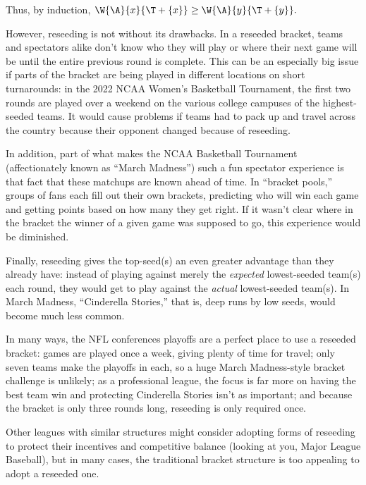 {{    Thus, by induction, $\W{\A}{x}{\T + \{x\}} \geq \W{\A}{y}{\T + \{y\}}.$
}{}




However, reseeding is not without its drawbacks. In a reseeded bracket, teams and spectators alike don't know who they will play or where their next game will be until the entire previous round is complete. This can be an especially big issue if parts of the bracket are being played in different locations on short turnarounds: in the 2022 NCAA Women's Basketball Tournament, the first two rounds are played over a weekend on the various college campuses of the highest-seeded teams. It would cause problems if teams had to pack up and travel across the country because their opponent changed because of reseeding.

In addition, part of what makes the NCAA Basketball Tournament (affectionately known as ``March Madness'') such a fun spectator experience is that fact that these matchups are known ahead of time. In ``bracket pools,'' groups of fans each fill out their own brackets, predicting who will win each game and getting points based on how many they get right. If it wasn't clear where in the bracket the winner of a given game was supposed to go, this experience would be diminished.

Finally, reseeding gives the top-seed(s) an even greater advantage than they already have: instead of playing against merely the \textit{expected} lowest-seeded team(s) each round, they would get to play against the \textit{actual} lowest-seeded team(s). In March Madness, ``Cinderella Stories,'' that is, deep runs by low seeds, would become much less common.

In many ways, the NFL conferences playoffs are a perfect place to use a reseeded bracket: games are played once a week, giving plenty of time for travel; only seven teams make the playoffs in each, so a huge March Madness-style bracket challenge is unlikely; as a professional league, the focus is far more on having the best team win and protecting Cinderella Stories isn't as important; and because the bracket is only three rounds long, reseeding is only required once.

Other leagues with similar structures might consider adopting forms of reseeding to protect their incentives and competitive balance (looking at you, Major League Baseball), but in many cases, the traditional bracket structure is too appealing to adopt a reseeded one.
}